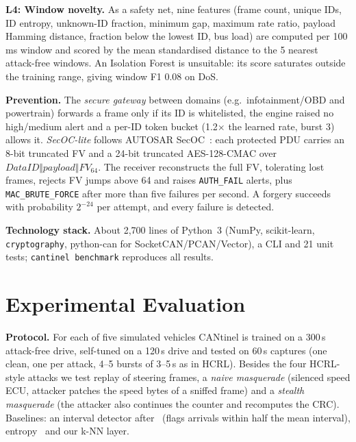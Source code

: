 \documentclass[runningheads]{llncs}
\begin{document}
\textbf{L4: Window novelty.} As a safety net, nine features (frame count, unique IDs, ID entropy, unknown-ID fraction,
minimum gap, maximum rate ratio, payload Hamming distance, fraction below the lowest ID, bus load) are computed per
100\,ms window and scored by the mean standardised distance to the 5 nearest attack-free windows. An Isolation Forest is unsuitable: its score saturates outside the training range, giving window F1 0.08 on DoS.

\textbf{Prevention.} The \emph{secure gateway} between domains (e.g.\ infotainment/OBD and powertrain) forwards a
frame only if its ID is whitelisted, the engine raised no high/medium alert and a per-ID token bucket (1.2$\times$ the
learned rate, burst 3) allows it. \emph{SecOC-lite} follows AUTOSAR SecOC~\cite{autosar_secoc}: each protected PDU
carries an 8-bit truncated FV and a 24-bit truncated AES-128-CMAC over $\mathit{DataID}\Vert\mathit{payload}\Vert
\mathit{FV}_{64}$. The receiver reconstructs the full FV, tolerating lost frames, rejects FV jumps above 64 and raises
\texttt{AUTH\_FAIL} alerts, plus \texttt{MAC\_BRUTE\_FORCE} after more than five failures per second. A forgery succeeds with probability $2^{-24}$ per attempt, and every failure is detected.

\textbf{Technology stack.} About 2{,}700 lines of Python~3 (NumPy, scikit-learn, \texttt{cryptography},
python-can for SocketCAN/PCAN/Vector), a CLI and 21 unit tests; \texttt{cantinel benchmark} reproduces all results.

\section{Experimental Evaluation}\label{sec:eval}
\textbf{Protocol.} For each of five simulated vehicles CANtinel is trained on a 300\,s attack-free drive, self-tuned
on a 120\,s drive and tested on 60\,s captures (one clean, one per attack, 4--5 bursts of 3--5\,s as in HCRL). Besides the four HCRL-style attacks we test replay of
steering frames, a \emph{naive masquerade} (silenced speed ECU, attacker patches the speed bytes of a sniffed frame)
and a \emph{stealth masquerade} (the attacker also continues the counter and recomputes the CRC). Baselines: an interval detector after~\cite{song2016} (flags arrivals within half the mean interval), entropy~\cite{muter2011} and our k-NN layer.
\end{document}
